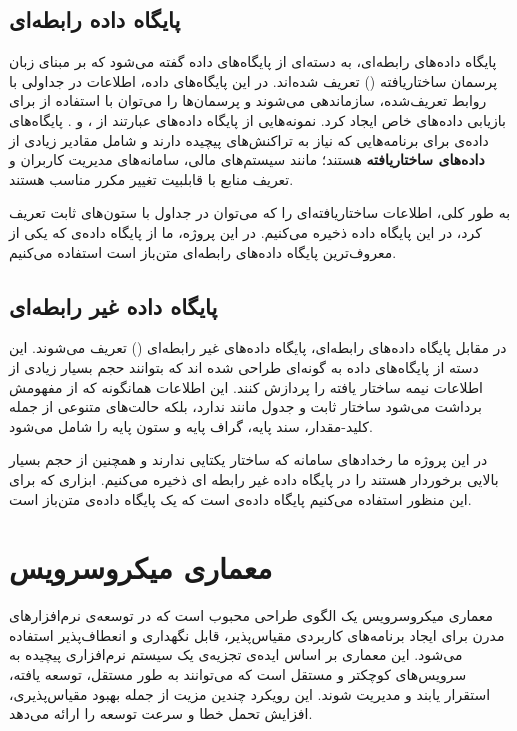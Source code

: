 \subsection{پایگاه داده رابطه‌ای}
پایگاه داده‌های رابطه‌ای، به دسته‌ای از پایگاه‌های داده گفته می‌شود که بر مبنای زبان پرسمان ساختاریافته () تعریف شده‌اند. در این پایگاه‌های داده، اطلاعات در جداولی با روابط تعریف‌شده، سازماندهی می‌شوند و پرسمان‌ها را می‌توان با استفاده از  برای بازیابی داده‌های خاص ایجاد کرد. نمونه‌هایی از پایگاه داده‌های  عبارتند از ،  و . پایگاه‌های داده‌ی  برای برنامه‌هایی که نیاز به تراکنش‌های پیچیده دارند و شامل مقادیر زیادی از \textbf{داده‌های ساختاریافته} هستند؛ مانند سیستم‌های مالی، سامانه‌های مدیریت کاربران و تعریف منابع با قابلبیت تغییر مکرر مناسب هستند.


به طور کلی، اطلاعات ساختاریافته‌ای را که می‌‌توان در جداول با ستون‌های ثابت تعریف کرد، در این پایگاه داده ذخیره می‌کنیم. در این پروژه، ما از پایگاه داده‌ی  که یکی از معروف‌ترین پایگاه داده‌های رابطه‌ای متن‌باز است استفاده می‌کنیم. 
\subsection{پایگاه داده غیر‌ رابطه‌ای}
در مقابل پایگاه‌ داده‌های رابطه‌ای، پایگاه داده‌های غیر رابطه‌ای () تعریف می‌شوند. این دسته از پایگاه‌های داده به گونه‌ای طراحی شده ‌اند که بتوانند حجم بسیار زیادی از اطلاعات نیمه ساختار یافته را پردازش کنند. این اطلاعات همانگونه که از مفهومش برداشت می‌شود ساختار ثابت و جدول مانند ندارد، بلکه حالت‌های متنوعی از جمله کلید-مقدار، سند پایه، گراف پایه و ستون پایه را شامل می‌شود\cite{Stonebraker2010}.

در این پروژه ما رخدادهای سامانه که ساختار یکتایی ندارند و همچنین از حجم بسیار بالایی برخوردار هستند را در پایگاه داده غیر رابطه ای ذخیره می‌کنیم. ابزاری که برای این منظور استفاده می‌کنیم پایگاه داده‌ی  است که یک پایگاه داده‌ی متن‌باز است.

\section{معماری میکروسرویس}
معماری میکروسرویس یک الگوی طراحی محبوب است که در توسعه‌ی نرم‌افزار‌های مدرن برای ایجاد برنامه‌های کاربردی مقیاس‌پذیر، قابل نگهداری و انعطاف‌پذیر استفاده می‌شود. این معماری بر اساس ایده‌ی تجزیه‌ی یک سیستم نرم‌افزاری پیچیده به سرویس‌های کوچکتر و مستقل است که می‌توانند به طور مستقل، توسعه یافته، استقرار یابند و مدیریت شوند. این رویکرد چندین مزیت از جمله بهبود مقیاس‌پذیری، افزایش تحمل خطا و سرعت توسعه را ارائه می‌دهد.

